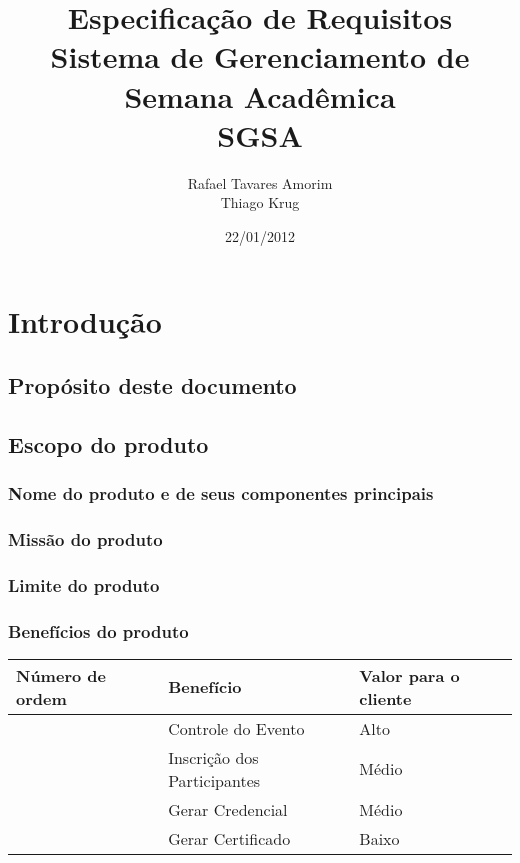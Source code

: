 \documentclass[12pt,a4paper]{article}
\begin{document}
    \title{
    	Especificação de Requisitos \\ 
    	Sistema de Gerenciamento de Semana Acadêmica \\
    	SGSA
    }
    \author{Rafael Tavares Amorim \\ Thiago Krug}
    \date{22/01/2012}
    \maketitle

	\newpage
    
    \tableofcontents
    
    \newpage
    \section{Introdução}
    	\subsection{Propósito deste documento}
        \subsection{Escopo do produto}
        	\subsubsection{Nome do produto e de seus componentes principais}
        	\subsubsection{Missão do produto}
        	\subsubsection{Limite do produto}
        	\subsubsection{Benefícios do produto}
        	\begin{table}[h]
	        	\noindent\begin{tabular}{|p{}|p{}|p{}|}
	        		\hline
	        		\setcounter{Number}{0}
	        	    \textbf{Número de ordem} & \textbf{Benefício} & \textbf{Valor para o cliente} \\
	        		\hline
	        		\Item & Controle do Evento & Alto \\
	        		\hline
	        		\Item & Inscrição dos Participantes & Médio \\
	        		\hline
	        		\Item & Gerar Credencial & Médio \\
	        		\hline
	        		\Item & Gerar Certificado & Baixo \\
	        		\hline
	        	\end{tabular}
        	\end{table}
        	
\end{document}
